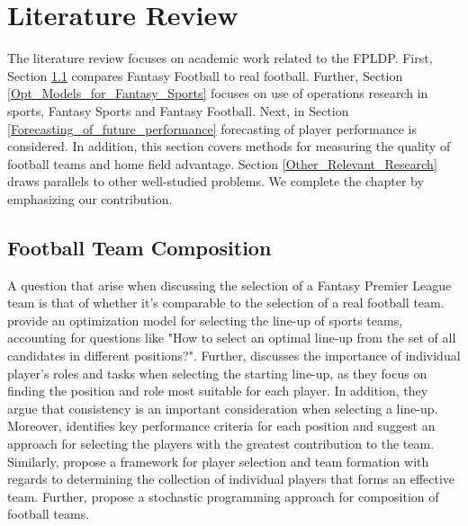 
\chapter{Literature Review}
The literature review focuses on academic work related to the FPLDP. First, Section \ref{Literature_fantasy_real} compares Fantasy Football to real football. Further, Section \ref{Opt_Models_for_Fantasy_Sports} focuses on use of operations research in sports, Fantasy Sports and Fantasy Football. Next, in Section \ref{Forecasting_of_future_performance} forecasting of player performance is considered. In addition, this section covers methods for measuring the quality of football teams and home field advantage. Section \ref{Other_Relevant_Research} draws parallels to other well-studied problems. We complete the chapter by emphasizing our contribution.

\section{Football Team Composition} \label{Literature_fantasy_real}

A question that arise when discussing the selection of a Fantasy Premier League team is that of whether it's comparable to the selection of a real football team. \cite{Boon} provide an optimization model for selecting the line-up of sports teams, accounting for questions like "How to select an optimal line-up from the set of all candidates in different positions?". Further, \cite{Trninic} discusses the importance of individual player's roles and tasks when selecting the starting line-up, as they focus on finding the position and role most suitable for each player. In addition, they argue that consistency is an important consideration when selecting a line-up. Moreover, \cite{Ozceylan} identifies key performance criteria for each position and suggest an approach for selecting the players with the greatest contribution to the team. Similarly, \cite{Tavana} propose a framework for player selection and team formation with regards to determining the collection of individual players that forms an effective team. Further, \cite{Pantuso} propose a stochastic programming approach for composition of football teams. 

\newpar

